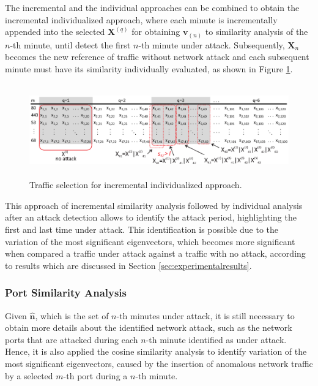 \documentclass[review]{elsarticle}
\begin{document}
The incremental and the individual approaches can be combined to obtain the incremental individualized approach, where each minute is incrementally appended into the selected $\boldsymbol{X}^{(q)}$ for obtaining $\boldsymbol{v}_{(n)}$ to similarity analysis of the $n$-th minute, until detect the first $n$-th minute under attack. Subsequently, $\boldsymbol{X}_n$ becomes the new reference of traffic without network attack and each subsequent minute must have its similarity individually evaluated, as shown in Figure \ref{fig:fig2}.

\begin{figure}[h!]
     \includegraphics[height=4cm, width=12.4cm]{results/figures/incremental_individualized.eps}
     \caption{Traffic selection for incremental individualized approach.}
     \label{fig:fig2}
\end{figure}

This approach of incremental similarity analysis followed by individual analysis after an attack detection allows to identify the attack period, highlighting the first and last time under attack. This identification is possible due to the variation of the most significant eigenvectors, which becomes more significant when compared a traffic under attack against a traffic with no attack, according to results which are discussed in Section \ref{sec:experimentalresults}.

\subsubsection{Port Similarity Analysis}
\label{sec:prop_PortSimilarityAnalysis}

Given $\boldsymbol{\hat{n}}$, which is the set of $n$-th minutes under attack, it is still necessary to obtain more details about the identified network attack, such as the network ports that are attacked during each $n$-th minute identified as under attack. Hence, it is also applied the cosine similarity analysis to identify variation of the most significant eigenvectors, caused by the insertion of anomalous network traffic by a selected $m$-th port during a $n$-th minute. 
\end{document}
